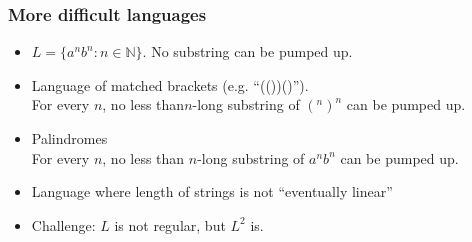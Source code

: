 \documentclass[languages_and_machines.tex]{subfiles}
\begin{document}
\begin{frame}
  \frametitle{More difficult languages}

  \begin{itemize}
  \item \(L = \{a^n b^n : n \in \mathbb N\}\). \pause No substring can be pumped up.

    \pause

  \item Language of matched brackets (e.g. ``(())()'').
    \\\pause For every \(n\), no less than\(n\)-long substring of \((^n)^n\) can be pumped up.

    \pause

  \item Palindromes
    \\\pause For every \(n\), no less than \(n\)-long substring of \(a^n b^n\) can be pumped up.

    \pause

  \item Language where length of strings is not ``eventually linear''

  \item Challenge: \(L\) is not regular, but \(L^2\) is.

  \end{itemize}
\end{frame}
\end{document}
